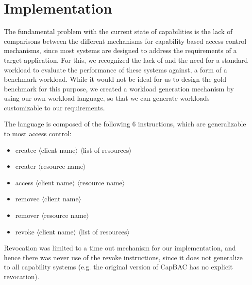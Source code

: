 \section{Implementation}
\label{sec:implementation}

The fundamental problem with the current state of capabilities is the lack of comparisons between the different mechanisms for capability based access control mechanisms, since most systems are designed to address the requirements of a target application. For this, we recognized the lack of and the need for a standard workload to evaluate the performance of these systems against, a form of a benchmark workload. While it would not be ideal for us to design the gold benchmark for this purpose, we created a workload generation mechanism by using our own workload language, so that we can generate workloads customizable to our requirements.

The language is composed of the following 6 instructions, which are generalizable to most access control:
\begin{itemize}
\item createc $\langle$client name$\rangle$ $\langle$list of resources$\rangle$
\item creater $\langle$resource name$\rangle$
\item access $\langle$client name$\rangle$ $\langle$resource name$\rangle$
\item removec $\langle$client name$\rangle$
\item remover $\langle$resource name$\rangle$
\item revoke $\langle$client name$\rangle$ $\langle$list of resources$\rangle$
\end{itemize}   
Revocation was limited to a time out mechanism for our implementation, and hence there was never use of the revoke instructions, since it does not generalize to all capability systems (e.g. the original version of CapBAC has no explicit revocation).

